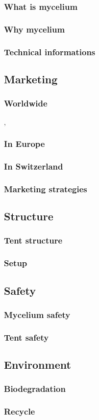 \documentclass{article}
\begin{document}
\subsubsection{What is mycelium}
\subsubsection{Why mycelium}
\subsubsection{Technical informations}

\subsection{Marketing}
\subsubsection{Worldwide}
,
\subsubsection{In Europe}
\subsubsection{In Switzerland}
\subsubsection{Marketing strategies}

\subsection{Structure}
\subsubsection{Tent structure}
\subsubsection{Setup}

\subsection{Safety}
\subsubsection{Mycelium safety}
\subsubsection{Tent safety}

\subsection{Environment}
\subsubsection{Biodegradation}
\subsubsection{Recycle}

\newpage
\end{document}
